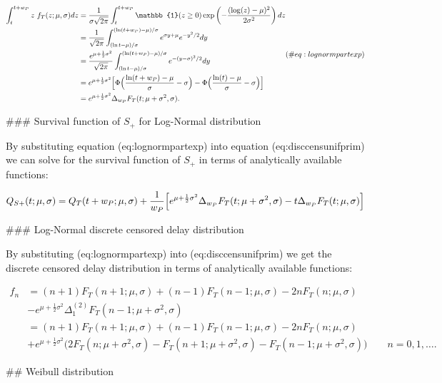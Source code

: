 \documentclass[10pt,letterpaper]{article}
\begin{document}
$$
\begin{aligned}
\int_t^{t+w_P} z~ f_T(z; \mu, \sigma) dz &= {1 \over \sigma \sqrt{2\pi}} \int_t^{t+w_P}  \mathbb{1}(z \geq 0)  \exp\left( - {(\log(z) - \mu)^2 \over 2 \sigma^2} \right) dz \\
&= {1 \over \sqrt{2\pi}} \int_{(\ln t - \mu)/\sigma}^{(\ln(t+w_P) - \mu)/\sigma} e^{\sigma y + \mu} e^{-y^2/2} dy\\
&= {e^{\mu + \frac{1}{2} \sigma^2} \over \sqrt{2 \pi} } \int_{(\ln t - \mu)/\sigma}^{(\ln(t+w_P) - \mu)/\sigma} e^{-(y- \sigma)^2/2} dy \\
&= e^{\mu + \frac{1}{2} \sigma^2} \Big[\Phi\Big({\ln(t+w_P) - \mu \over \sigma} - \sigma\Big) - \Phi\Big({\ln(t) - \mu \over \sigma} - \sigma\Big) \Big]\\
&= e^{\mu + \frac{1}{2} \sigma^2} \Delta_{w_P}F_T(t; \mu + \sigma^2, \sigma).
\end{aligned} (\#eq:lognormpartexp)
$$

### Survival function of $S_{+}$ for Log-Normal distribution

By substituting equation \@ref(eq:lognormpartexp) into equation \@ref(eq:disccensunifprim) we can solve for the survival function of $S_+$ in terms of analytically available functions:

$$
Q_{S+}(t ;\mu, \sigma) = Q_T(t + w_P;\mu, \sigma) + { 1 \over w_P} \Big[ e^{\mu + \frac{1}{2} \sigma^2} \Delta_{w_P}F_T(t; \mu + \sigma^2, \sigma) - t\Delta_{w_P}F_T(t; \mu, \sigma) \Big]
$$

### Log-Normal discrete censored delay distribution

By substituting \@ref(eq:lognormpartexp) into \@ref(eq:disccensunifprim) we get the discrete censored delay distribution in terms of analytically available functions:

$$
\begin{aligned}
f_n &= (n+1) F_T(n+1; \mu, \sigma) + (n-1) F_T(n-1; \mu, \sigma) - 2 n F_T(n; \mu, \sigma) \\
 &- e^{\mu + \frac{1}{2} \sigma^2} \Delta_1^{(2)}F_T(n-1;\mu + \sigma^2, \sigma) \\
 &= (n+1) F_T(n+1; \mu, \sigma) + (n-1) F_T(n-1; \mu, \sigma) - 2 n F_T(n; \mu, \sigma) \\
  &+ e^{\mu + \frac{1}{2} \sigma^2} \Big( 2 F_T(n; \mu + \sigma^2, \sigma) - F_T(n+1; \mu + \sigma^2, \sigma) - F_T(n-1; \mu + \sigma^2, \sigma)  \Big)\qquad n = 0, 1, \dots.
\end{aligned}
$$

## Weibull distribution
\end{document}
